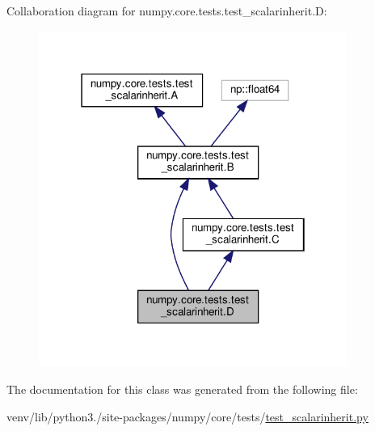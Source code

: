Collaboration diagram for numpy.\+core.\+tests.\+test\+\_\+scalarinherit.\+D\+:
\nopagebreak
\begin{figure}[H]
\begin{center}
\leavevmode
\includegraphics[width=286pt]{classnumpy_1_1core_1_1tests_1_1test__scalarinherit_1_1D__coll__graph}
\end{center}
\end{figure}


The documentation for this class was generated from the following file\+:\begin{DoxyCompactItemize}
\item 
venv/lib/python3./site-\/packages/numpy/core/tests/\hyperlink{test__scalarinherit_8py}{test\+\_\+scalarinherit.\+py}\end{DoxyCompactItemize}
